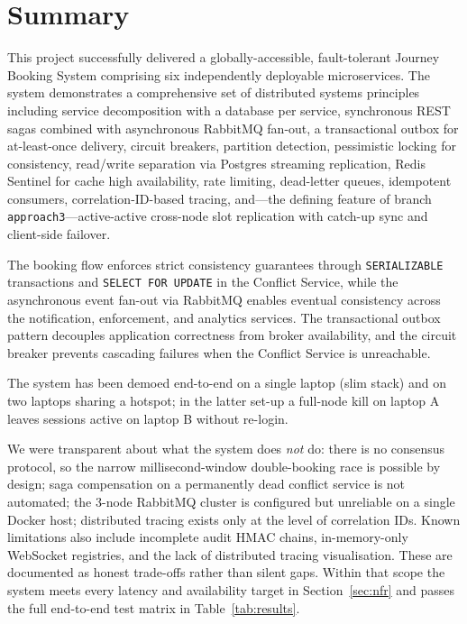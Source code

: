 \documentclass[12pt,a4paper]{article}
\begin{document}
\section{Summary}
\label{sec:conclusion}
 
This project successfully delivered a globally-accessible, fault-tolerant Journey Booking System comprising six independently deployable microservices. The system demonstrates a comprehensive set of distributed systems principles including service decomposition with a database per service, synchronous REST sagas combined with asynchronous RabbitMQ fan-out, a transactional outbox for at-least-once delivery, circuit breakers, partition detection, pessimistic locking for consistency, read/write separation via Postgres streaming replication, Redis Sentinel for cache high availability, rate limiting, dead-letter queues, idempotent consumers, correlation-ID-based tracing, and---the defining feature of branch \texttt{approach3}---active-active cross-node slot replication with catch-up sync and client-side failover.
 
The booking flow enforces strict consistency guarantees through \texttt{SERIALIZABLE} transactions and \texttt{SELECT FOR UPDATE} in the Conflict Service, while the asynchronous event fan-out via RabbitMQ enables eventual consistency across the notification, enforcement, and analytics services. The transactional outbox pattern decouples application correctness from broker availability, and the circuit breaker prevents cascading failures when the Conflict Service is unreachable.
 
The system has been demoed end-to-end on a single laptop (slim stack) and on two laptops sharing a hotspot; in the latter set-up a full-node kill on laptop A leaves sessions active on laptop B without re-login.

We were transparent about what the system does \emph{not} do: there is no consensus protocol, so the narrow millisecond-window double-booking race is possible by design; saga compensation on a permanently dead conflict service is not automated; the 3-node RabbitMQ cluster is configured but unreliable on a single Docker host; distributed tracing exists only at the level of correlation IDs. Known limitations also include incomplete audit HMAC chains, in-memory-only WebSocket registries, and the lack of distributed tracing visualisation. These are documented as honest trade-offs rather than silent gaps. Within that scope the system meets every latency and availability target in Section~\ref{sec:nfr} and passes the full end-to-end test matrix in Table~\ref{tab:results}.
\end{document}
